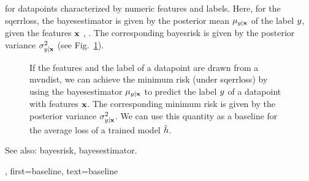 {{		for \glspl{datapoint} characterized by numeric \glspl{feature} and \glspl{label}.
		Here, for the \gls{sqerrloss}, the \gls{bayesestimator} is given by the \gls{posterior} 
		\gls{mean} $\mu_{y|{\bf x}}$ of the \gls{label} $y$, given the 
		\glspl{feature} ${\bf x}$ \cite{GrayProbBook}, \cite{LC}. The corresponding \gls{bayesrisk} 
		is given by the \gls{posterior} \gls{variance} 
		$\sigma^{2}_{y|{\bf x}}$ (see Fig.\ \ref{fig_post_baseline_dict}).
		\begin{figure}[H]
		\begin{center}
		\end{center}
		\caption{If the \glspl{feature} and the \gls{label} of a \gls{datapoint} are drawn 
			from a \gls{mvndist}, we can achieve the \gls{minimum} \gls{risk} (under \gls{sqerrloss}) 
			by using the \gls{bayesestimator} $\mu_{y|{\bf x}}$ 
			to predict the \gls{label} $y$ of a \gls{datapoint} with \glspl{feature} ${\bf x}$. The corresponding 
			\gls{minimum} \gls{risk} is given by the \gls{posterior} \gls{variance} $\sigma^{2}_{y|{\bf x}}$. We can use 
			this quantity as a baseline for the average \gls{loss} of a trained \gls{model} $\hat{h}$. \label{fig_post_baseline_dict}}
		\end{figure}
		See also: \gls{bayesrisk}, \gls{bayesestimator}.},
    first={baseline},
    text={baseline}
}


